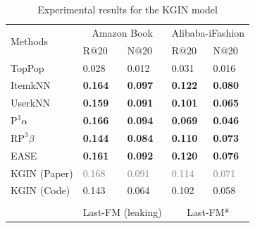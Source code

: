 \documentclass[sigconf,natbib=true,nonacm]{acmart}
\newcommand{\palpha}{\ensuremath{\text{P}^3\!\alpha}\xspace}
\newcommand{\pbeta}{\ensuremath{\text{RP}^3\!\beta}\xspace}
\begin{document}
\begin{table}[htbp]
    \caption{Experimental results for the KGIN model }
    \label{tab:kgnn}
    \centering
    \begin{tabular}{l l l l l }
        \multirow{2}{*}{Methods} & \multicolumn{2}{c}{Amazon Book}                 & \multicolumn{2}{c}{Alibaba-iFashion} \\

        ~                       & R@20             & N@20                        & R@20               & N@20 \\ \hline
        TopPop                  & 0.028            & 0.012                       & 0.031              & 0.016       \\
        ItemkNN                 & \textbf{0.164}   & \textbf{0.097}              & \textbf{0.122}     & \textbf{0.080}        \\
        UserkNN                 & \textbf{0.159}   & \textbf{0.091}              & \textbf{0.101}     & \textbf{0.065}         \\
        \palpha                 & \textbf{0.166}   & \textbf{0.094}              & \textbf{0.069}     & \textbf{0.046}          \\
        \pbeta                  & \textbf{0.144}   & \textbf{0.084}              & \textbf{0.110}     & \textbf{0.073}          \\
        EASE                    & \textbf{0.161}   & \textbf{0.092}              & \textbf{0.120}     & \textbf{0.076}          \\ \hline
        KGIN (Paper)            & \textcolor{gray}{0.168} & \textcolor{gray}{0.091} & \textcolor{gray}{0.114}   & \textcolor{gray}{0.071}                   \\
        KGIN (Code)                   & 0.143              & 0.064                       & 0.102                   & 0.058                \\
         & & & & \\
        \multirow{2}{*}{}       & \multicolumn{2}{c}{Last-FM (leaking)}                       & \multicolumn{2}{c}{Last-FM*} \\


\end{tabular}
\end{table}
\end{document}

